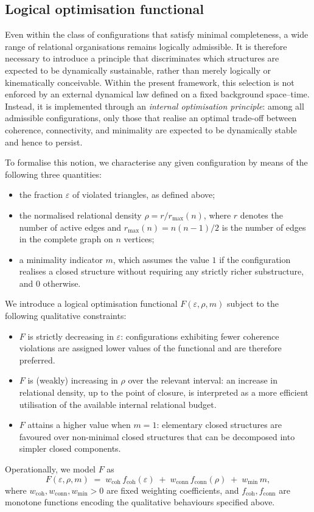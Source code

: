 \documentclass[11pt,a4paper]{article}
\begin{document}
\subsection{Logical optimisation functional}

Even within the class of configurations that satisfy minimal completeness, a wide range of relational organisations remains logically admissible. It is therefore necessary to introduce a principle that discriminates which structures are expected to be dynamically sustainable, rather than merely logically or kinematically conceivable. Within the present framework, this selection is not enforced by an external dynamical law defined on a fixed background space–time. Instead, it is implemented through an \emph{internal optimisation principle}: among all admissible configurations, only those that realise an optimal trade-off between coherence, connectivity, and minimality are expected to be dynamically stable and hence to persist.

To formalise this notion, we characterise any given configuration by means of the following three quantities:
\begin{itemize}
  \item the fraction \(\varepsilon\) of violated triangles, as defined above;
  \item the normalised relational density \(\rho = r / r_{\max}(n)\), where \(r\) denotes the number of active edges and \(r_{\max}(n) = n(n-1)/2\) is the number of edges in the complete graph on \(n\) vertices;
  \item a minimality indicator \(m\), which assumes the value \(1\) if the configuration realises a closed structure without requiring any strictly richer substructure, and \(0\) otherwise.
\end{itemize}

We introduce a logical optimisation functional \(F(\varepsilon,\rho,m)\) subject to the following qualitative constraints:
\begin{itemize}
  \item \(F\) is strictly decreasing in \(\varepsilon\): configurations exhibiting fewer coherence violations are assigned lower values of the functional and are therefore preferred.
  \item \(F\) is (weakly) increasing in \(\rho\) over the relevant interval: an increase in relational density, up to the point of closure, is interpreted as a more efficient utilisation of the available internal relational budget.
  \item \(F\) attains a higher value when \(m=1\): elementary closed structures are favoured over non-minimal closed structures that can be decomposed into simpler closed components.
\end{itemize}
Operationally, we model \(F\) as
\[
  F(\varepsilon,\rho,m) \;=\; w_{\mathrm{coh}}\,f_{\mathrm{coh}}(\varepsilon) \;+\; w_{\mathrm{conn}}\,f_{\mathrm{conn}}(\rho) \;+\; w_{\mathrm{min}}\,m,
\]
where \(w_{\mathrm{coh}}, w_{\mathrm{conn}}, w_{\mathrm{min}} > 0\) are fixed weighting coefficients, and \(f_{\mathrm{coh}}, f_{\mathrm{conn}}\) are monotone functions encoding the qualitative behaviours specified above.
\end{document}
